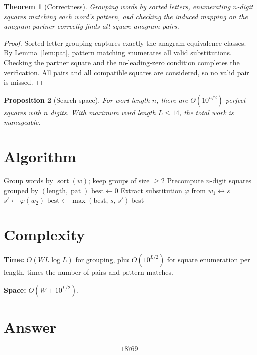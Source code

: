 \documentclass[12pt]{article}
\newtheorem{theorem}{Theorem}
\newtheorem{proposition}[theorem]{Proposition}
\begin{document}
\begin{theorem}[Correctness]
Grouping words by sorted letters, enumerating $n$-digit squares matching each word's pattern, and checking the induced mapping on the anagram partner correctly finds all square anagram pairs.
\end{theorem}
\begin{proof}
Sorted-letter grouping captures exactly the anagram equivalence classes. By Lemma~\ref{lem:pat}, pattern matching enumerates all valid substitutions. Checking the partner square and the no-leading-zero condition completes the verification. All pairs and all compatible squares are considered, so no valid pair is missed.
\end{proof}

\begin{proposition}[Search space]
For word length $n$, there are $\Theta(10^{n/2})$ perfect squares with $n$ digits. With maximum word length $L \le 14$, the total work is manageable.
\end{proposition}

\section{Algorithm}

\begin{algorithm}[H]
\caption{Find largest anagramic square}
\begin{algorithmic}[1]
\STATE Group words by $\operatorname{sort}(w)$; keep groups of size $\ge 2$
\STATE Precompute $n$-digit squares grouped by $(\text{length}, \operatorname{pat})$
\STATE $\text{best} \gets 0$
        \STATE Extract substitution $\varphi$ from $w_1 \leftrightarrow s$
        \STATE $s' \gets \varphi(w_2)$
            \STATE $\text{best} \gets \max(\text{best},\, s,\, s')$
        \ENDIF
    \ENDFOR
\ENDFOR
\RETURN best
\end{algorithmic}
\end{algorithm}

\section{Complexity}

\textbf{Time:} $O(W L \log L)$ for grouping, plus $O(10^{L/2})$ for square enumeration per length, times the number of pairs and pattern matches.

\textbf{Space:} $O(W + 10^{L/2})$.

\section{Answer}

\[
\boxed{18769}
\]
\end{document}

